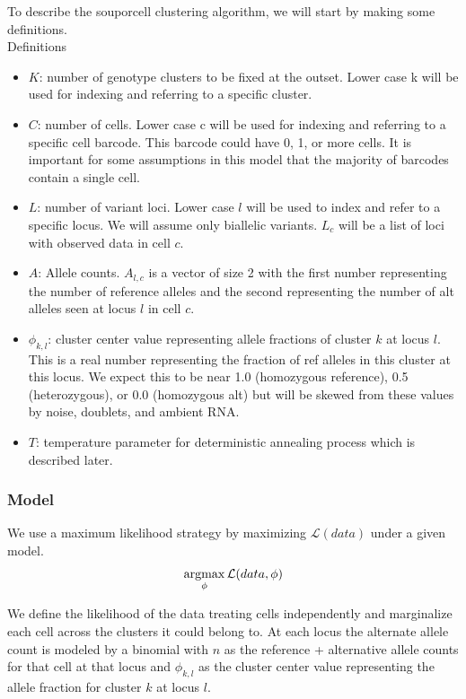 \par{
To describe the souporcell clustering algorithm, we will start by making some definitions.
}
\\
Definitions
\begin{itemize}
\item $K$: number of genotype clusters to be fixed at the outset. Lower case k will be used for indexing and referring to a specific cluster.
\item $C$: number of cells. Lower case c will be used for indexing and referring to a specific cell barcode. This barcode could have 0, 1, or more cells. It is important for some assumptions in this model that the majority of barcodes contain a single cell. 
\item $L$: number of variant loci. Lower case $l$ will be used to index and refer to a specific locus. We will assume only biallelic variants. $L_c$ will be a list of loci with observed data in cell $c$.
\item $A$: Allele counts. $A_{l,c}$ is a vector of size 2 with the first number representing the number of reference alleles and the second representing the number of alt alleles seen at locus $l$ in cell $c$.
\item $\phi_{k,l}$: cluster center value representing allele fractions of cluster $k$ at locus $l$. This is a real number representing the fraction of ref alleles in this cluster at this locus. We expect this to be near 1.0 (homozygous reference), 0.5 (heterozygous), or 0.0 (homozygous alt) but will be skewed from these values by noise, doublets, and ambient RNA. 
\item $T$: temperature parameter for deterministic annealing process which is described later.

\end{itemize}

\noindent
\subsubsection{Model}

We use a maximum likelihood strategy by maximizing $\mathcal{L}(data)$ under a given model. 
\begin{equation}
\operatorname*{argmax}_{\phi} \mathcal{L}(data, \phi)
\end{equation}

We define the likelihood of the data treating cells independently and marginalize each cell across the clusters it could belong to. At each locus the alternate allele count is modeled by a binomial with $n$ as the reference + alternative allele counts for that cell at that locus and $\phi_{k,l}$ as the cluster center value representing the allele fraction for cluster $k$ at locus $l$.

